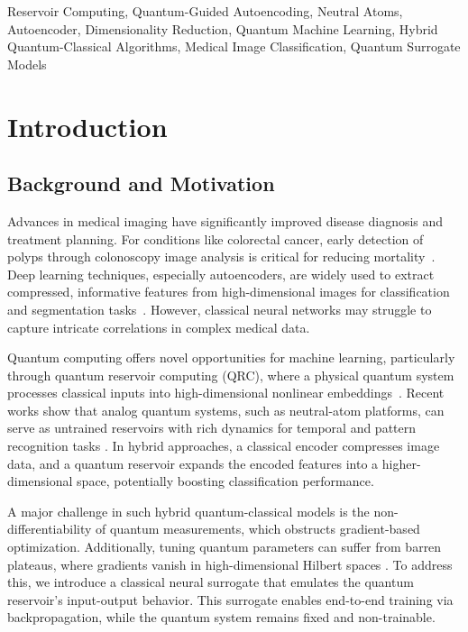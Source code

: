 \documentclass[conference]{IEEEtran}
\begin{document}
\begin{IEEEkeywords}
Reservoir Computing, Quantum-Guided Autoencoding,
Neutral Atoms, Autoencoder, Dimensionality Reduction, 
Quantum Machine Learning, Hybrid Quantum-Classical Algorithms, 
Medical Image Classification, Quantum Surrogate Models
\end{IEEEkeywords}

\section{Introduction}

\subsection{Background and Motivation}
Advances in medical imaging have significantly improved 
disease diagnosis and treatment planning. For conditions 
like colorectal cancer, early detection of polyps through 
colonoscopy image analysis is critical for reducing mortality~\cite{estevaGuideDeepLearning2019}. 
Deep learning techniques, especially autoencoders, are widely 
used to extract compressed, informative features from 
high-dimensional images for classification and segmentation 
tasks~\cite{bengioLearningDeepArchitectures}. However, classical neural networks may struggle 
to capture intricate correlations in complex medical data.

Quantum computing offers novel opportunities 
for machine learning, particularly through quantum reservoir 
computing (QRC), where a physical quantum system processes 
classical inputs into high-dimensional nonlinear embeddings~\cite{tanakaRecentAdvancesPhysical2019,fujiiHarnessingDisorderedQuantum2017}. Recent works show that analog quantum systems, 
such as neutral-atom platforms, can serve as untrained 
reservoirs with rich dynamics for temporal and pattern 
recognition tasks \cite{domingoOptimalQuantumReservoir2022,kornjavcaLargescaleQuantumReservoir2024}. 
In hybrid approaches, a classical encoder compresses 
image data, and a quantum reservoir expands 
the encoded features into a higher-dimensional space, 
potentially boosting classification performance.

A major challenge in such hybrid quantum-classical 
models is the non-differentiability of quantum measurements, 
which obstructs gradient-based optimization. Additionally, 
tuning quantum parameters can suffer from barren plateaus, where 
gradients vanish in high-dimensional Hilbert spaces \cite{mccleanBarrenPlateausQuantum2018}. 
To address this, we introduce a classical neural surrogate 
that emulates the quantum reservoir's input-output behavior. 
This surrogate enables end-to-end training via backpropagation, 
while the quantum system remains fixed and non-trainable.
\end{document}
